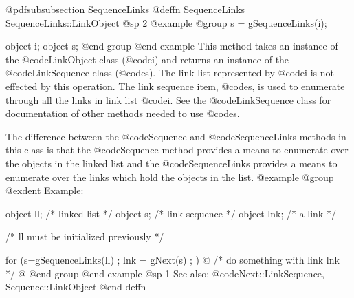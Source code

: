 @pdfsubsubsection {SequenceLinks}
@deffn {SequenceLinks} SequenceLinks::LinkObject
@sp 2
@example
@group
s = gSequenceLinks(i);

object  i;
object  s;
@end group
@end example
This method takes an instance of the @code{LinkObject} class (@code{i})
and returns an instance of the @code{LinkSequence} class
(@code{s}).  The link list represented by @code{i} is not effected by
this operation.  The link sequence item, @code{s}, is used to enumerate
through all the links in link list @code{i}.  See the
@code{LinkSequence} class for documentation of other methods
needed to use @code{s}.

The difference between the @code{Sequence} and @code{SequenceLinks}
methods in this class is that the @code{Sequence} method provides a
means to enumerate over the objects in the linked list and the
@code{SequenceLinks} provides a means to enumerate over the links
which hold the objects in the list.
@example
@group
@exdent Example:

object  ll;  /*  linked list    */
object  s;   /*  link sequence  */
object  lnk; /*  a link         */

/*  ll must be initialized previously  */

for (s=gSequenceLinks(ll) ; lnk = gNext(s) ; )  @{
        /*  do something with link lnk  */
@}
@end group
@end example
@sp 1
See also:  @code{Next::LinkSequence, Sequence::LinkObject}
@end deffn






